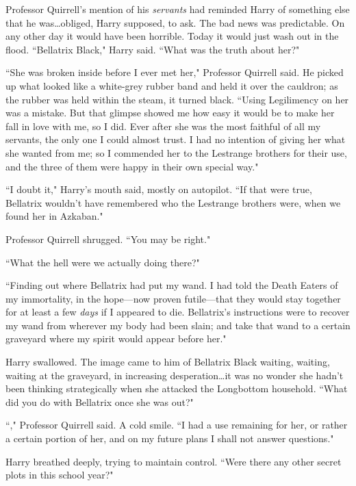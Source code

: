 Professor Quirrell's mention of his \emph{servants} had reminded Harry of something else that he was…obliged, Harry supposed, to ask. The bad news was predictable. On any other day it would have been horrible. Today it would just wash out in the flood. ``Bellatrix Black," Harry said. ``What was the truth about her?"

``She was broken inside before I ever met her," Professor Quirrell said. He picked up what looked like a white-grey rubber band and held it over the cauldron; as the rubber was held within the steam, it turned black. ``Using Legilimency on her was a mistake. But that glimpse showed me how easy it would be to make her fall in love with me, so I did. Ever after she was the most faithful of all my servants, the only one I could almost trust. I had no intention of giving her what she wanted from me; so I commended her to the Lestrange brothers for their use, and the three of them were happy in their own special way."

``I doubt it," Harry's mouth said, mostly on autopilot. ``If that were true, Bellatrix wouldn't have remembered who the Lestrange brothers were, when we found her in Azkaban."

Professor Quirrell shrugged. ``You may be right."

``What the hell were we actually doing there?"

``Finding out where Bellatrix had put my wand. I had told the Death Eaters of my immortality, in the hope—now proven futile—that they would stay together for at least a few \emph{days} if I appeared to die. Bellatrix's instructions were to recover my wand from wherever my body had been slain; and take that wand to a certain graveyard where my spirit would appear before her."

Harry swallowed. The image came to him of Bellatrix Black waiting, waiting, waiting at the graveyard, in increasing desperation…it was no wonder she hadn't been thinking strategically when she attacked the Longbottom household. ``What did you do with Bellatrix once she was out?"

``," Professor Quirrell said. A cold smile. ``I had a use remaining for her, or rather a certain portion of her, and on my future plans I shall not answer questions."

Harry breathed deeply, trying to maintain control. ``Were there any other secret plots in this school year?"

